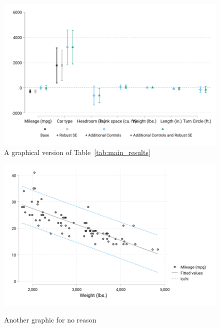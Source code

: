 \documentclass[12pt]{article}%
\begin{document}
\begin{figure}[h]
	\caption[Coefficient Plot]{A graphical version of Table~\ref{tab:main_results}}
	  \centering
	  \includegraphics[width=\linewidth]{../output/coef_plot.pdf}

	\label{fig:coef_plot}
\end{figure}
\begin{figure}[h]
	\caption[Alternative Regression Plot]{Another graphic for no reason}
	  \centering
	  \includegraphics[width=\linewidth]{../output/regression_plot.pdf}
	\label{fig:altertive_regression}
\end{figure}
\end{document}
